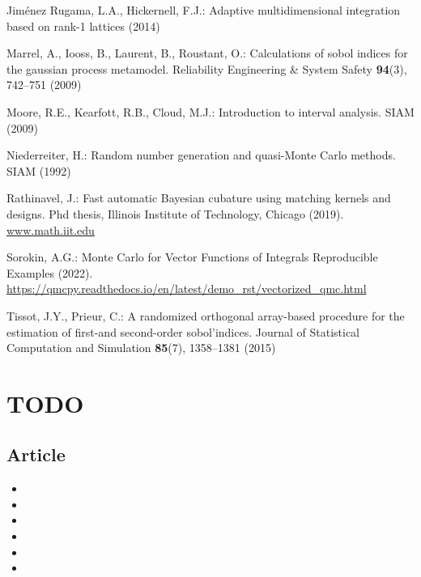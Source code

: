 \documentclass[graybox]{svmult}
\begin{document}
\begin{thebibliography}{10}
{Jim\'enez Rugama}, L.A., Hickernell, F.J.: Adaptive multidimensional
  integration based on rank-1 lattices (2014)

Marrel, A., Iooss, B., Laurent, B., Roustant, O.: Calculations of sobol indices
  for the gaussian process metamodel.
\newblock Reliability Engineering \& System Safety \textbf{94}(3), 742--751
  (2009)

Moore, R.E., Kearfott, R.B., Cloud, M.J.: Introduction to interval analysis.
\newblock SIAM (2009)

Niederreiter, H.: Random number generation and quasi-Monte Carlo methods.
\newblock SIAM (1992)

Rathinavel, J.: {F}ast automatic {B}ayesian cubature using matching kernels and
  designs.
\newblock Phd thesis, Illinois Institute of Technology, Chicago (2019).
\newblock \urlprefix\url{www.math.iit.edu}

Sorokin, A.G.: {M}onte {C}arlo for {V}ector {F}unctions of {I}ntegrals
  {R}eproducible {E}xamples (2022).
\newblock \urlprefix\url{https://qmcpy.readthedocs.io/en/latest/demo\_rst/vectorized\_qmc.html}

Tissot, J.Y., Prieur, C.: A randomized orthogonal array-based procedure for the
  estimation of first-and second-order sobol'indices.
\newblock Journal of Statistical Computation and Simulation \textbf{85}(7),
  1358--1381 (2015)

\end{thebibliography}


\iffalse
\section*{TODO}

\subsection*{Article}

\begin{itemize}
    \item {}
    \item {}
    \item {}
    \item {}
    \item {}
    \item {}
\end{itemize}
\end{document}
